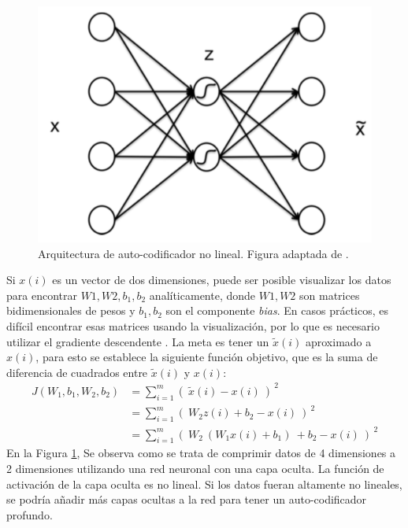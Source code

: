     \begin{figure}[htp]
        \centering
        \includegraphics[scale=0.49]{chapter3/aenco2.png}
        \caption{Arquitectura de auto-codificador no lineal. Figura adaptada de \cite{Le15atutorial}.}
        \label{fig:aenco2}
     \end{figure}
     
    Si $x(i)$ es un vector de dos dimensiones, puede ser posible visualizar los datos para encontrar $W1, W2, b_1, b_2$ analíticamente, donde $W1, W2$ son matrices bidimensionales de pesos y $b_1, b_2$ son el componente \textit{bias}. En casos prácticos, es difícil encontrar esas matrices usando la visualización, por lo que es necesario utilizar el gradiente descendente \cite{stochastic-gradient-tricks}. La meta es tener un $\tilde{x}(i)$ aproximado a $x(i)$, para esto se establece la siguiente función objetivo, que es la suma de diferencia de cuadrados entre $\tilde{x}(i)$ y $x(i)$:
    \begin{equation}
    \begin{aligned}
     J(W_1,b_1,W_2,b_2) & = \sum_{i=1}^m\left(\ \tilde{x}(i)-x(i)\ \right )^{\ 2} \\
      & = \sum_{i=1}^m\left(\ W_2z(i) + b_2-x(i)\ \right )^{\ 2}\\
     & = \sum_{i=1}^m\left(\ W_2 \ (W_1x(i)+b_1) \ + b_2-x(i)\ \right )^{\ 2}
    \end{aligned}
    \end{equation}
    En la Figura \ref{fig:aenco2}, Se observa como se trata de comprimir datos de 4 dimensiones a 2 dimensiones utilizando una red neuronal con una capa oculta. La función de activación de la capa oculta es no lineal. Si los datos fueran altamente no lineales, se podría añadir más capas ocultas a la red para tener un auto-codificador profundo.
    

